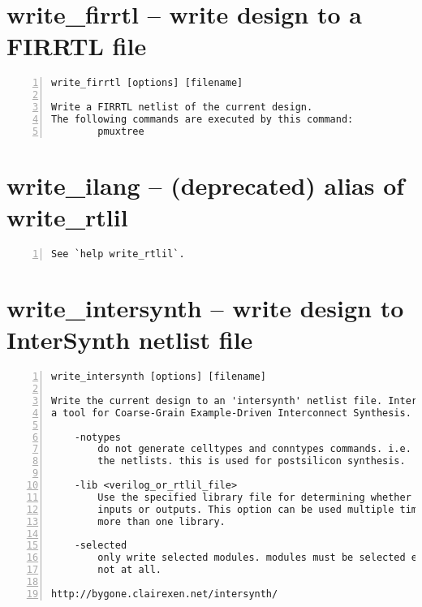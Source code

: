 \section{write\_firrtl -- write design to a FIRRTL file}
\label{cmd:write_firrtl}
\begin{lstlisting}[numbers=left,frame=single]
    write_firrtl [options] [filename]

Write a FIRRTL netlist of the current design.
The following commands are executed by this command:
        pmuxtree
\end{lstlisting}

\section{write\_ilang -- (deprecated) alias of write\_rtlil}
\label{cmd:write_ilang}
\begin{lstlisting}[numbers=left,frame=single]
See `help write_rtlil`.
\end{lstlisting}

\section{write\_intersynth -- write design to InterSynth netlist file}
\label{cmd:write_intersynth}
\begin{lstlisting}[numbers=left,frame=single]
    write_intersynth [options] [filename]

Write the current design to an 'intersynth' netlist file. InterSynth is
a tool for Coarse-Grain Example-Driven Interconnect Synthesis.

    -notypes
        do not generate celltypes and conntypes commands. i.e. just output
        the netlists. this is used for postsilicon synthesis.

    -lib <verilog_or_rtlil_file>
        Use the specified library file for determining whether cell ports are
        inputs or outputs. This option can be used multiple times to specify
        more than one library.

    -selected
        only write selected modules. modules must be selected entirely or
        not at all.

http://bygone.clairexen.net/intersynth/
\end{lstlisting}

